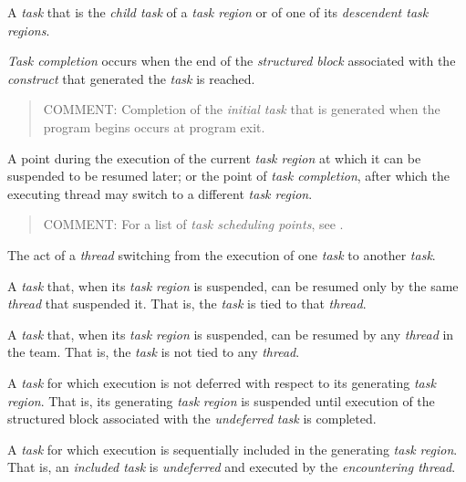 \glossarydefstart
A \emph{task} that is the \emph{child task} of a \emph{task region} or 
of one of its \emph{descendent task regions}.
\glossarydefend

\glossarydefstart
\emph{Task completion} occurs when the end of the \emph{structured block} 
associated with the \emph{construct} that generated the \emph{task} is reached.

\begin{quote}
COMMENT: Completion of the \emph{initial task} that is generated when the 
program begins occurs at program exit.
\end{quote}
\glossarydefend

\glossarydefstart
A point during the execution of the current \emph{task region} at which it 
can be suspended to be resumed later; or the point of \emph{task completion}, 
after which the executing thread may switch to a different \emph{task region}.

\begin{quote}
COMMENT: For a list of \emph{task scheduling points}, see 
.
\end{quote}
\glossarydefend

\glossarydefstart
The act of a \emph{thread} switching from the execution of one \emph{task} 
to another \emph{task}.
\glossarydefend

\glossarydefstart
A \emph{task} that, when its \emph{task region} is suspended, can be resumed 
only by the same \emph{thread} that suspended it. That is, the \emph{task} 
is tied to that \emph{thread}.
\glossarydefend

\glossarydefstart
A \emph{task} that, when its \emph{task region} is suspended, can be resumed 
by any \emph{thread} in the team. That is, the \emph{task} is not tied to 
any \emph{thread}.
\glossarydefend

\glossarydefstart
A \emph{task} for which execution is not deferred with respect to its 
generating \emph{task} \emph{region}. That is, its generating \emph{task}
\emph{region} is suspended until execution of the structured block associated 
with the \emph{undeferred} \emph{task} is completed.
\glossarydefend

\glossarydefstart
A \emph{task} for which execution is sequentially included in the 
generating \emph{task region}. That is, an \emph{included task} is 
\emph{undeferred} and executed by the \emph{encountering thread}.
\glossarydefend

